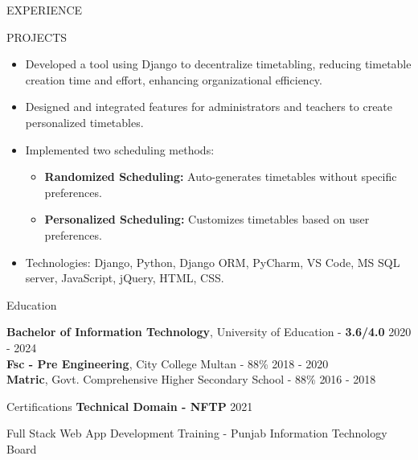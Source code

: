 \documentclass{resume} %
\begin{document}
\begin{rSection}{EXPERIENCE}
\begin{rSection}{PROJECTS}
 
 \begin{itemize}
 	\item Developed a tool using Django to decentralize timetabling, reducing timetable creation time and effort, enhancing organizational efficiency.
 	\item Designed and integrated features for administrators and teachers to create personalized timetables.
 	\item Implemented two scheduling methods:
 	\begin{itemize}
 		\item \textbf{Randomized Scheduling:} Auto-generates timetables without specific preferences.
 		\item \textbf{Personalized Scheduling:} Customizes timetables based on user preferences.
 	\end{itemize}

 	\item Technologies: Django, Python, Django ORM, PyCharm, VS Code, MS SQL server, JavaScript, jQuery, HTML, CSS.
 \end{itemize}

\end{rSection} 
\end{rSection} 

\begin{rSection}{Education}
	
	
	{\bf Bachelor of Information Technology}, University of Education - {\bf 3.6/4.0 }\hfill {2020 - 2024} 
	\\
	{\bf Fsc  - Pre Engineering}, City College Multan - 88\% \hfill {2018 - 2020}
	\\
	{\bf Matric}, Govt. Comprehensive Higher Secondary School - 88\% \hfill {2016 - 2018}
	
	
\end{rSection}

\begin{rSection}{Certifications} 
	\textbf{Technical Domain - NFTP} \hfill 2021 
    \item {Full Stack Web App Development Training - Punjab Information Technology
    Board}



\end{rSection}

\end{document}
